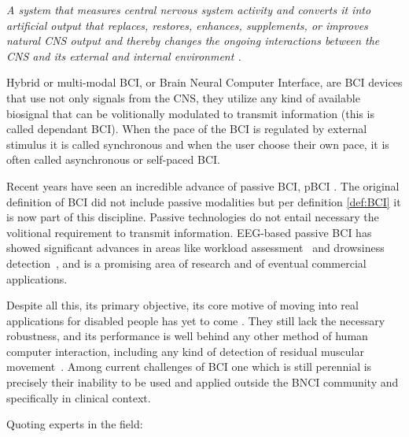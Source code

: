 \vspace{7px}

\begin{story}
\theoremstyle{definition}
\begin{definition}{}
\label{def:BCI}
\textit{A system that measures central nervous system activity and converts it into artificial output that replaces, restores, enhances, supplements, or improves natural CNS output and thereby changes the ongoing interactions between the CNS and its external and internal environment \cite{WolpawJonathanR2012}.}
\end{definition}
\end{story}

Hybrid or multi-modal BCI, or Brain Neural Computer Interface, are BCI devices that use not only signals from the CNS, they utilize any kind of available biosignal that can be volitionally modulated to transmit information (this is called dependant BCI).  When the pace of the BCI is regulated by external stimulus it is called synchronous and when the user choose their own pace, it is often called asynchronous or self-paced BCI.

Recent years have seen an incredible advance of passive BCI, pBCI \cite{Zander2010}.  The original definition of BCI did not include passive modalities but per definition \ref{def:BCI} it is now part of this discipline.  Passive technologies do not entail necessary the volitional requirement to transmit information.  EEG-based passive BCI has showed significant advances in areas like workload assessment~\cite{Roy2013} and drowsiness detection~\cite{Arico2017}, and is a promising area of research and of eventual commercial applications.

Despite all this, its primary objective, its core motive of moving into real applications for disabled people has yet to come \cite{Brunner2014,Jeunet2014,Allison2013}. They still lack the necessary robustness, and its performance is well behind any other method of human computer interaction, including any kind of detection of residual muscular movement~\cite{Clerc2016}. Among current challenges of BCI \cite{Brunner2014} one which is still perennial is precisely their inability to be used and applied outside the BNCI community and specifically in clinical context.  

Quoting experts in the field:

